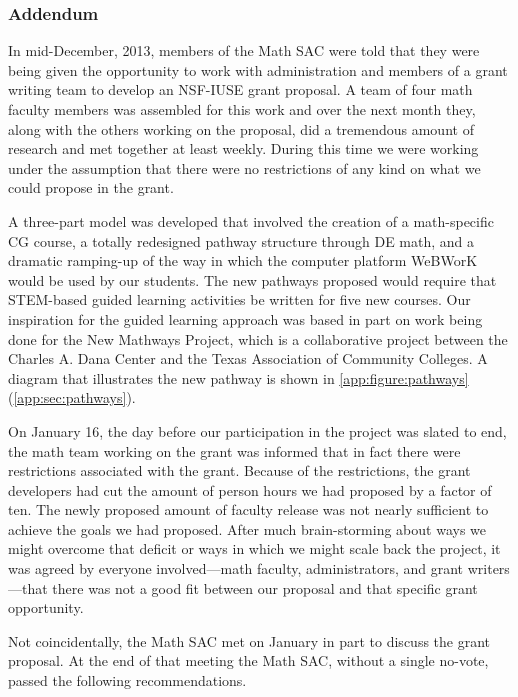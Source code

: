 \subsubsection{Addendum}\label{over:subsub:nsfiuse}
In mid-December, 2013, members of the Math SAC were told that they were being
given the opportunity to work with administration and members of a grant writing
team to develop an NSF-IUSE grant proposal.  A team of four math faculty members
was assembled for this work and over the next month they, along with the others
working on the proposal, did a tremendous amount of research and met together at
least weekly.  During this time we were working under the assumption that there
were no restrictions of any kind on what we could propose in the grant.

A three-part model was developed that involved the creation of a math-specific
CG course, a totally redesigned pathway structure through DE math, and a
dramatic ramping-up of the way in which the computer platform WeBWorK would be
used by our students.  The new pathways proposed would require that STEM-based
guided learning activities be written for five new courses.  Our inspiration for
the guided learning approach was based in part on work being done for the New
Mathways Project,  which is a collaborative project between the Charles A. Dana
Center and the Texas Association of Community Colleges. A diagram that
illustrates the new pathway is shown in \cref{app:figure:pathways}
(\vref{app:sec:pathways}).

On January 16, the day before our participation in the project was slated to
end, the math team working on the grant was informed that in fact there were
restrictions associated with the grant.  Because of the restrictions, the grant
developers had cut the amount of person hours we had proposed by a factor of
ten.  The newly proposed amount of faculty release was not nearly sufficient to
achieve the goals we had proposed.  After much brain-storming about ways we
might overcome that deficit or ways in which we might scale back the project, it
was agreed by everyone involved---math faculty, administrators, and grant
writers---that there was not a good fit between our proposal and that specific
grant opportunity.

Not coincidentally, the Math SAC met on January  in part to discuss the grant
proposal.  At the end of that meeting the Math SAC, without a single no-vote,
passed the following recommendations.


